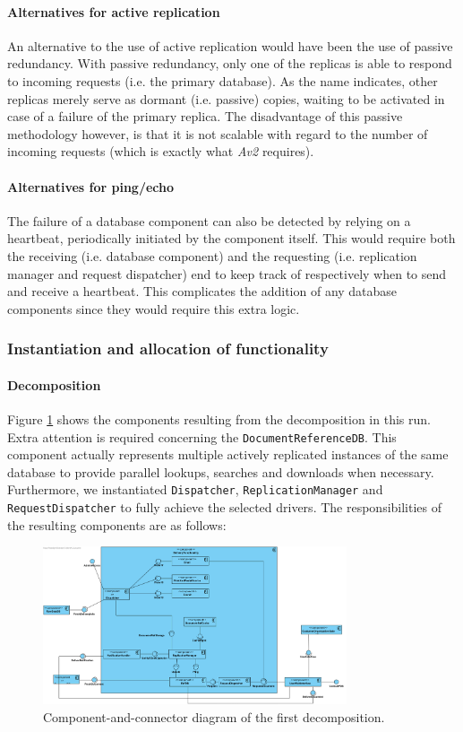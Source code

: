 \documentclass[a4paper,10pt]{article}
\begin{document}
\paragraph{Alternatives for active replication}
An alternative to the use of active replication would have been the use of passive redundancy. With passive redundancy, only one of the replicas is able to respond to incoming requests (i.e. the primary database). As the name indicates, other replicas merely serve as dormant (i.e. passive) copies, waiting to be activated in case of a failure of the primary replica. The disadvantage of this passive methodology however, is that it is not scalable with regard to the number of incoming requests (which is exactly what \emph{Av2} requires).

\paragraph{Alternatives for ping/echo}
The failure of a database component can also be detected by relying on a heartbeat, periodically initiated by the component itself. This would require both the receiving (i.e. database component) and the requesting (i.e. replication manager and request dispatcher) end to keep track of respectively when to send and receive a heartbeat. This complicates the addition of any database components since they would require this extra logic.

\subsubsection{Instantiation and allocation of functionality}
\paragraph{Decomposition}
Figure \ref{fig:compandcondecomp2} shows the components resulting from the decomposition in this run. Extra attention is required concerning the \texttt{DocumentReferenceDB}. This component actually represents multiple actively replicated instances of the same database to provide parallel lookups, searches and downloads when necessary. Furthermore, we instantiated \texttt{Dispatcher}, \texttt{ReplicationManager} and \texttt{RequestDispatcher} to fully achieve the selected drivers.
The responsibilities of the resulting components are as follows:

\begin{figure}[!htp]
	\centering
	\includegraphics[width=0.8\textwidth]{DeliveryFunctionality.png}
	\caption{Component-and-connector diagram of the first decomposition.
	}\label{fig:compandcondecomp2}
\end{figure}
\end{document}
